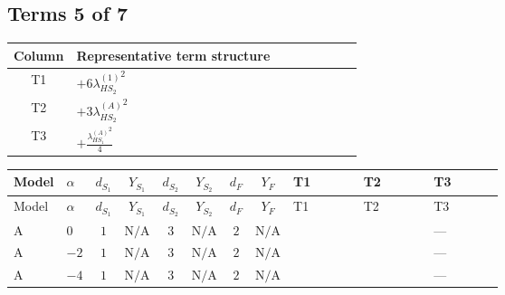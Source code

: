 \documentclass[8pt]{article}
\begin{document}
\begin{landscape}
\subsection*{Terms 5 of 7}
\begin{center}
\begin{tabular}{@{}c >{\raggedright\arraybackslash}p{0.82\linewidth}@{}}
\toprule
Column & Representative term structure \\
\midrule
T1 & \(\displaystyle +6 {\lambda_{HS_2}^{(1)}}^2\) \\
\midrule
T2 & \(\displaystyle +3 {\lambda_{HS_2}^{(A)}}^2\) \\
\midrule
T3 & \(\displaystyle +\frac{{\lambda_{HS_1}^{(A)}}^2}{4}\) \\
\midrule
\bottomrule
\end{tabular}
\end{center}
\smallskip
\tiny
\begin{longtable}{@{}llcccccc >{\raggedright\arraybackslash}p{0.21\linewidth} >{\raggedright\arraybackslash}p{0.21\linewidth} >{\raggedright\arraybackslash}p{0.21\linewidth}@{}}
\toprule
Model & $\alpha$ & $d_{S_1}$ & $Y_{S_1}$ & $d_{S_2}$ & $Y_{S_2}$ & $d_F$ & $Y_F$ & T1 & T2 & T3 \\
\midrule
\endfirsthead
\toprule
Model & $\alpha$ & $d_{S_1}$ & $Y_{S_1}$ & $d_{S_2}$ & $Y_{S_2}$ & $d_F$ & $Y_F$ & T1 & T2 & T3 \\
\midrule
\endhead
A & $0$ & $1$ & $\text{N/A}$ & $3$ & $\text{N/A}$ & $2$ & $\text{N/A}$ & \scriptsize\adjustbox{max width=\linewidth}{$\begin{gathered} +6 {\lambda_{HS_2}^{(1)}}^2\end{gathered}$} & \scriptsize\adjustbox{max width=\linewidth}{$\begin{gathered} +3 {\lambda_{HS_2}^{(A)}}^2\end{gathered}$} & --- \\
\midrule
A & $-2$ & $1$ & $\text{N/A}$ & $3$ & $\text{N/A}$ & $2$ & $\text{N/A}$ & \scriptsize\adjustbox{max width=\linewidth}{$\begin{gathered} +6 {\lambda_{HS_2}^{(1)}}^2\end{gathered}$} & \scriptsize\adjustbox{max width=\linewidth}{$\begin{gathered} +3 {\lambda_{HS_2}^{(A)}}^2\end{gathered}$} & --- \\
\midrule
A & $-4$ & $1$ & $\text{N/A}$ & $3$ & $\text{N/A}$ & $2$ & $\text{N/A}$ & \scriptsize\adjustbox{max width=\linewidth}{$\begin{gathered} +6 {\lambda_{HS_2}^{(1)}}^2\end{gathered}$} & \scriptsize\adjustbox{max width=\linewidth}{$\begin{gathered} +3 {\lambda_{HS_2}^{(A)}}^2\end{gathered}$} & --- \\

\end{longtable}
\end{landscape}
\end{document}
